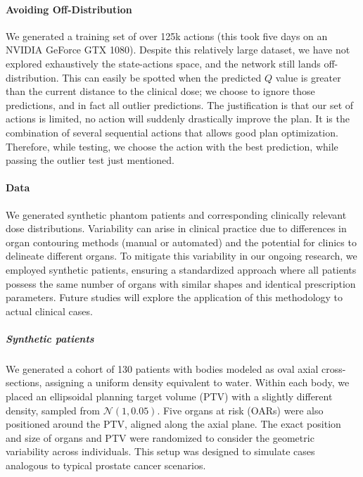 \paragraph{Avoiding Off-Distribution}
We generated a training set of over 125k actions (this took five days on an NVIDIA GeForce GTX 1080).
Despite this relatively large dataset, we have not explored exhaustively the state-actions space, and the network still lands off-distribution.
This can easily be spotted when the predicted $Q$ value is greater than the current distance to the clinical dose; we choose to ignore those predictions, and in fact all outlier predictions.
The justification is that our set of actions is limited, no action will suddenly drastically improve the plan.
It is the combination of several sequential actions that allows good plan optimization.
Therefore, while testing, we choose the action with the best prediction, while passing the outlier test just mentioned.

\paragraph{Data}
We generated synthetic phantom patients and corresponding clinically relevant dose distributions.
Variability can arise in clinical practice due to differences in organ contouring methods (manual or automated) and the potential for clinics to delineate different organs.
To mitigate this variability in our ongoing research, we employed synthetic patients, ensuring a standardized approach where all patients possess the same number of organs with similar shapes and identical prescription parameters.
Future studies will explore the application of this methodology to actual clinical cases.

\subparagraph{Synthetic patients}
We generated a cohort of 130 patients with bodies modeled as oval axial cross-sections, assigning a uniform density equivalent to water.
Within each body, we placed an ellipsoidal planning target volume (PTV) with a slightly different density, sampled from $\mathcal{N}(1,0.05)$.
Five organs at risk (OARs) were also positioned around the PTV, aligned along the axial plane.
The exact position and size of organs and PTV were randomized to consider the geometric variability across individuals.
This setup was designed to simulate cases analogous to typical prostate cancer scenarios.

